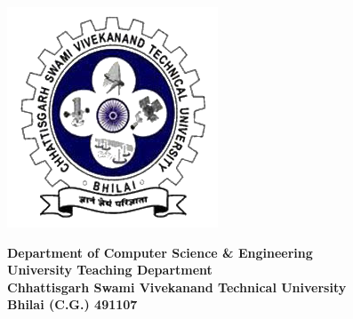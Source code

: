 \begin{minipage}{0.17\textwidth}
    \centering
    \includegraphics[width=\textwidth]{images/logo.png}
  \end{minipage}
  \hfil
  \large
  \begin{minipage}{0.7\textwidth}
    \centering
    \textbf{Department of Computer Science \& Engineering}\\
    \textbf{University Teaching Department}\\
    \textbf{Chhattisgarh Swami Vivekanand Technical University}\\
    \textbf{Bhilai (C.G.) 491107}
  \end{minipage}
  
  \noindent\makebox[\linewidth]{\rule{\textwidth}{0.4pt}}